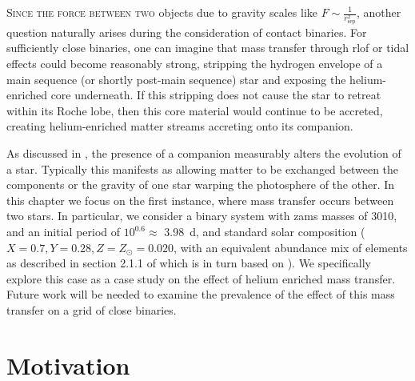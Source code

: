 
\label{chap:he_mass_transfer}

\lettrine[lines=3]{S}{ince the force between two} objects due to gravity scales like $F\sim\frac{1}{r_\text{sep}^2}$, another question naturally arises during the consideration of contact binaries. For sufficiently close binaries, one can imagine that mass transfer through \gls{rlof} or tidal effects could become reasonably strong, stripping the hydrogen envelope of a main sequence (or shortly post-main sequence) star and exposing the helium-enriched core underneath. If this stripping does not cause the star to retreat within its Roche lobe, then this core material would continue to be accreted, creating helium-enriched matter streams accreting onto its companion.

As discussed in , the presence of a companion measurably alters the evolution of a star. Typically this manifests as allowing matter to be exchanged between the components or the gravity of one star warping the photosphere of the other. In this chapter we focus on the first instance, where mass transfer occurs between two stars. In particular, we consider a binary system with \gls{zams} masses of \SI[parse-numbers=false]{30+10}{\msun}, and an initial period of $10^{0.6}\approx$ \SI{3.98}{\day}, and standard solar composition ($X=0.7, Y=0.28, Z=Z_\odot=0.020$, with an equivalent abundance mix of elements as described in section 2.1.1 of \citet{Eldridge:2017} which is in turn based on \citet{Grevesse:1993}). We specifically explore this case as a case study on the effect of helium enriched mass transfer. Future work will be needed to examine the prevalence of the effect of this mass transfer on a grid of close binaries.


\section{Motivation}

